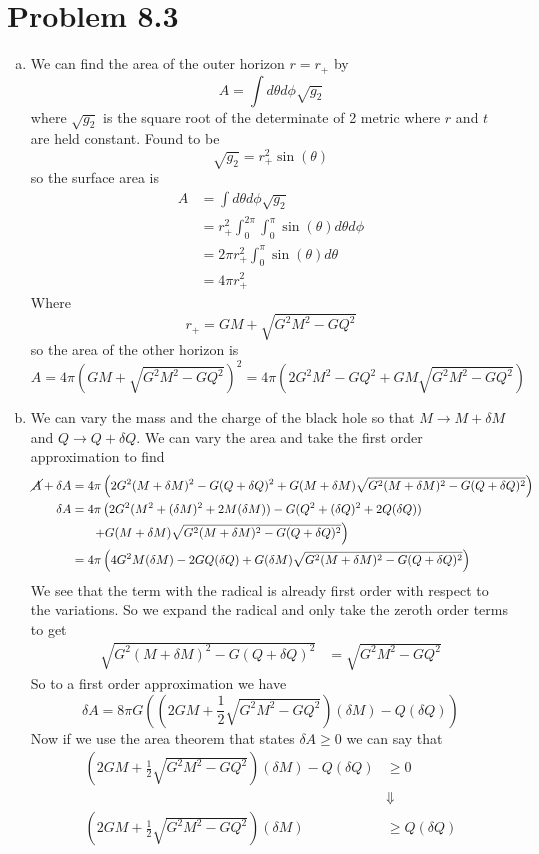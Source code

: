 \documentclass[11pt]{article}
\numberwithin{equation}{section}
\newcommand{\HWnum}{8}
\begin{document}
\section{Problem \HWnum.3}
\begin{enumerate}[(a)]
\item
We can find the area of the outer horizon $r=r_+$ by 
$$A = \int d\theta d\phi \sqrt{g_2}$$
where $\sqrt{g_2}$ is the square root of the determinate of 2 metric where $r$ and $t$ are held constant. Found to be
$$\sqrt{g_2} = r_+^2\sin(\theta)$$
so the surface area is 
\begin{align*}
A &= \int d\theta d\phi \sqrt{g_2}\\
&= r_+^2\int_{0}^{2\pi}\int_{0}^{\pi} \sin(\theta)d\theta d\phi\\
&= 2\pi r_+^2\int_{0}^{\pi} \sin(\theta)d\theta \\
&= 4\pi r_+^2
\end{align*}
Where
$$r_+ = GM + \sqrt{G^2M^2-GQ^2}$$
so the area of the other horizon is
$$A = 4\pi\left(GM + \sqrt{G^2M^2-GQ^2}\right)^2 = 4\pi\left(2G^2M^2 - GQ^2 + GM\sqrt{G^2M^2-GQ^2}\right)$$

\item
We can vary the mass and the charge of the black hole so that $M\rightarrow M+\delta M$ and $Q\rightarrow Q+\delta Q$. We can vary the area and take the first order approximation to find
\begin{align*}
\cancel{A}+\delta A &= 4\pi\left(2G^2(M+\delta M)^2 - G(Q+\delta Q)^2 + G(M+\delta M)\sqrt{G^2(M+\delta M)^2-G(Q+\delta Q)^2}\right)\\
\delta A &= 4\pi\left(2G^2(M^2 + (\delta M)^2 + 2M(\delta M)) - G(Q^2+(\delta Q)^2+2Q(\delta Q))\right.\\
&\ \ \ \ \ \left. + G(M+\delta M)\sqrt{G^2(M+\delta M)^2-G(Q+\delta Q)^2}\right)\\
&= 4\pi\left(4G^2M(\delta M) - 2GQ(\delta Q) + G(\delta M)\sqrt{G^2(M+\delta M)^2-G(Q+\delta Q)^2}\right)
\end{align*}
We see that the term with the radical is already first order with respect to the variations. So we expand the radical and only take the zeroth order terms to get
\begin{align*}
\sqrt{G^2(M+\delta M)^2-G(Q+\delta Q)^2} &= \sqrt{G^2M^2-GQ^2}
\end{align*}
So to a first order approximation we have
$$\delta A= 8\pi G\left(\left(2GM  + \frac{1}{2}\sqrt{G^2M^2-GQ^2}\right)(\delta M)- Q(\delta Q)\right)$$
Now if we use the area theorem that states $\delta A\ge 0$ we can say that
\begin{align*}
\left(2GM  + \frac{1}{2}\sqrt{G^2M^2-GQ^2}\right)(\delta M)- Q(\delta Q) &\ge 0\\
&\Downarrow\\
\left(2GM  + \frac{1}{2}\sqrt{G^2M^2-GQ^2}\right)(\delta M) &\ge Q(\delta Q)
\end{align*}


\end{enumerate}
\end{document}
